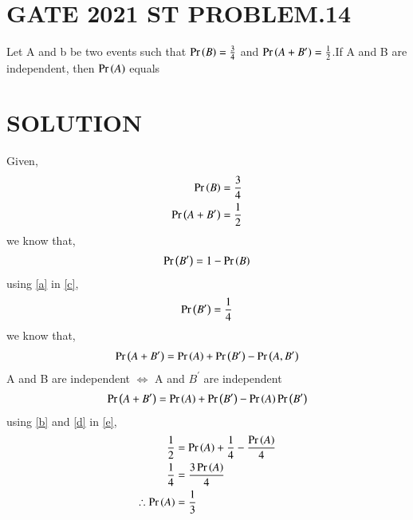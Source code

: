 \documentclass[journal,12pt,twocolumn]{IEEEtran}
\begin{document}
\section{GATE 2021 ST PROBLEM.14}

Let A and b be two events such that $\Pr\left(B\right)=\frac{3}{4}$ and $\Pr\left(A + B^{\prime}\right)=\frac{1}{2}$.If A and B are independent, then $\Pr\left(A\right)$ equals

\section{SOLUTION}
Given,
\begin{align}
\Pr\left(B\right)=\frac{3}{4}\label{a}\\
\Pr\left(A + B^{\prime}\right) =\frac{1}{2} \label{b}
\end{align}
we know that,
\begin{align}
\Pr\left(B^{\prime}\right) = 1-\Pr\left(B\right) \label{c}
\end{align}
using \eqref{a} in \eqref{c},
\begin{align}
\Pr\left(B^{\prime}\right) = \frac{1}{4} \label{d}
\end{align}
we know that,
\begin{align}
\Pr\left(A + B^{\prime}\right) = \Pr\left(A\right) +\Pr\left(B^{\prime}\right) - \Pr\left(A,B^{\prime}\right)
\end{align}
A and B are independent $\iff$ A and $B^{\prime}$ are independent
\begin{align}
\Pr\left(A + B^{\prime}\right) = \Pr\left(A\right) +\Pr\left(B^{\prime}\right) - \Pr\left(A\right)\Pr\left(B^{\prime}\right) \label{e}
\end{align}
using \eqref{b}  and \eqref{d} in \eqref{e},
\begin{align}
\frac{1}{2} &= \Pr\left(A\right) + \frac{1}{4} - \frac{\Pr\left(A\right)}{4}\\
\frac{1}{4} &= \frac{3\Pr\left(A\right)}{4}\\
\therefore \Pr\left(A\right) &= \frac{1}{3}
\end{align}
\end{document}
